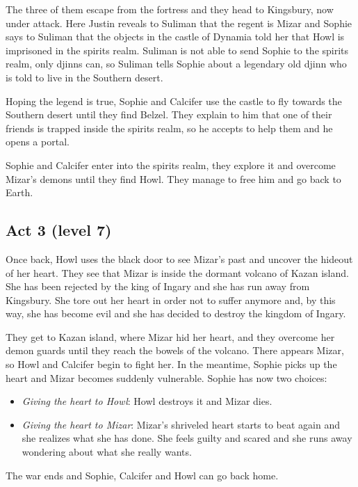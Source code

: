 The three of them escape from the fortress and they head to Kingsbury, now under attack. Here Justin reveals to Suliman that the regent is Mizar and Sophie says to Suliman that the objects in the castle of Dynamia told her that Howl is imprisoned in the spirits realm. Suliman is not able to send Sophie to the spirits realm, only djinns can, so Suliman tells Sophie about a legendary old djinn who is told to live in the Southern desert.

Hoping the legend is true, Sophie and Calcifer use the castle to fly towards the Southern desert until they find Belzel. They explain to him that one of their friends is trapped inside the spirits realm, so he accepts to help them and he opens a portal.

Sophie and Calcifer enter into the spirits realm, they explore it and overcome Mizar's demons until they find Howl. They manage to free him and go back to Earth.

\subsection*{Act 3 (level 7)}
Once back, Howl uses the black door to see Mizar's past and uncover the hideout of her heart. They see that Mizar is inside the dormant volcano of Kazan island. She has been rejected by the king of Ingary and she has run away from Kingsbury. She tore out her heart in order not to suffer anymore and, by this way, she has become evil and she has decided to destroy the kingdom of Ingary.

They get to Kazan island, where Mizar hid her heart, and they overcome her demon guards until they reach the bowels of the volcano. There appears Mizar, so Howl and Calcifer begin to fight her. In the meantime, Sophie picks up the heart and Mizar becomes suddenly vulnerable. Sophie has now two choices:
\begin{itemize}
\item \textit{Giving the heart to Howl}: Howl destroys it and Mizar dies.
\item \textit{Giving the heart to Mizar}: Mizar's shriveled heart starts to beat again and she realizes what she has done. She feels guilty and scared and she runs away wondering about what she really wants.
\end{itemize} 

The war ends and Sophie, Calcifer and Howl can go back home.